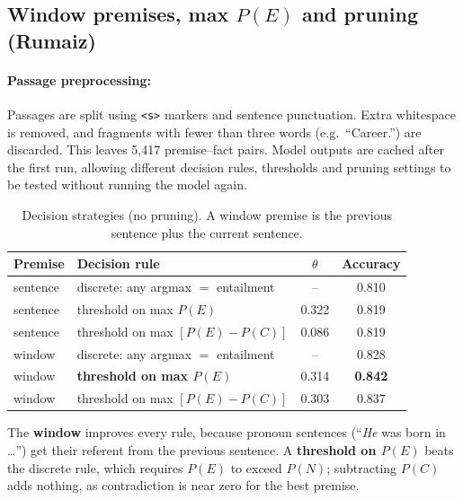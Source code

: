 \documentclass[12pt,a4paper]{article}
\begin{document}
\subsection{Window premises, max \texorpdfstring{$P(E)$}{P(E)} and pruning (Rumaiz)}
\label{sec:p2rumaiz}
\paragraph{Passage preprocessing:} Passages are split using \texttt{<s>} markers and sentence punctuation. Extra whitespace is removed, and fragments with fewer than three words (e.g.\ ``Career.'') are discarded. This leaves 5{,}417 premise--fact pairs. Model outputs are cached after the first run, allowing different decision rules, thresholds and pruning settings to be tested without running the model again.

\begin{table}[H]
\centering
\begin{tabular}{llcc}
\toprule
Premise & Decision rule & $\theta$ & Accuracy \\
\midrule
sentence & discrete: any argmax $=$ entailment & -- & 0.810 \\
sentence & threshold on max $P(E)$ & 0.322 & 0.819 \\
sentence & threshold on max $[P(E)-P(C)]$ & 0.086 & 0.819 \\
window & discrete: any argmax $=$ entailment & -- & 0.828 \\
window & \textbf{threshold on max $P(E)$} & 0.314 & \textbf{0.842} \\
window & threshold on max $[P(E)-P(C)]$ & 0.303 & 0.837 \\
\bottomrule
\end{tabular}
\caption{Decision strategies (no pruning). A window premise is the previous sentence plus the current sentence.}
\label{tab:strategies}
\end{table}

\noindent The \textbf{window} improves every rule, because pronoun sentences (``\emph{He} was born in \dots'') get their referent from the previous sentence. A \textbf{threshold on $P(E)$} beats the discrete rule, which requires $P(E)$ to exceed $P(N)$; subtracting $P(C)$ adds nothing, as contradiction is near zero for the best premise.
\end{document}
